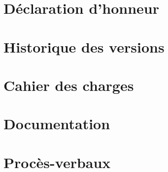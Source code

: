 \chapter*{Déclaration d'honneur}


\appendix

\chapter{Historique des versions}


\chapter{Cahier des charges}


\chapter{Documentation}


% 

\chapter{Procès-verbaux}




